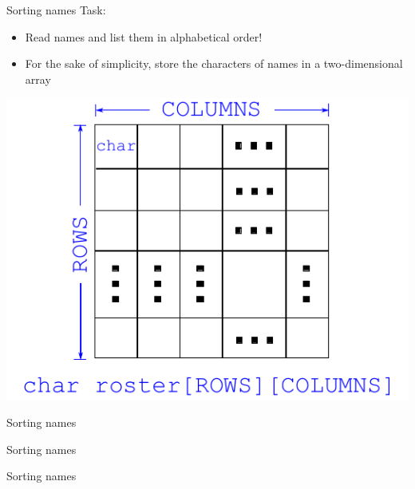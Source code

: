 \documentclass[usenames,dvipsnames,aspectratio=169]{beamer}
\begin{document}
\begin{frame}{Sorting names}
  Task:
  \begin{itemize}
    \item Read names and list them in alphabetical order!
    \item For the sake of simplicity, store the characters of names in a two-dimensional array
  \end{itemize}
  \begin{center}
    \includegraphics[scale=0.75]{roster1.pdf}
  \end{center}
\end{frame}

\begin{frame}{Sorting names}
  \begin{exampleblock}{}
    
    
  \end{exampleblock}
\end{frame}

\begin{frame}{Sorting names}
  \begin{exampleblock}{}
    
  \end{exampleblock}
\end{frame}

\begin{frame}{Sorting names}
  \begin{exampleblock}{}
    
  \end{exampleblock}
\end{frame}
\end{document}
